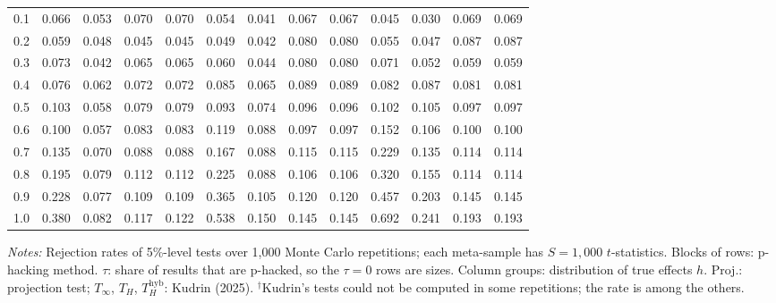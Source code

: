 \begin{table}[htbp]
\begin{tabular}{lcccccccccccc}
0.1 & 0.066 & 0.053 & 0.070 & 0.070 & 0.054 & 0.041 & 0.067 & 0.067 & 0.045 & 0.030 & 0.069 & 0.069 \\
0.2 & 0.059 & 0.048 & 0.045 & 0.045 & 0.049 & 0.042 & 0.080 & 0.080 & 0.055 & 0.047 & 0.087 & 0.087 \\
0.3 & 0.073 & 0.042 & 0.065 & 0.065 & 0.060 & 0.044 & 0.080 & 0.080 & 0.071 & 0.052 & 0.059 & 0.059 \\
0.4 & 0.076 & 0.062 & 0.072 & 0.072 & 0.085 & 0.065 & 0.089 & 0.089 & 0.082 & 0.087 & 0.081 & 0.081 \\
0.5 & 0.103 & 0.058 & 0.079 & 0.079 & 0.093 & 0.074 & 0.096 & 0.096 & 0.102 & 0.105 & 0.097 & 0.097 \\
0.6 & 0.100 & 0.057 & 0.083 & 0.083 & 0.119 & 0.088 & 0.097 & 0.097 & 0.152 & 0.106 & 0.100 & 0.100 \\
0.7 & 0.135 & 0.070 & 0.088 & 0.088 & 0.167 & 0.088 & 0.115 & 0.115 & 0.229 & 0.135 & 0.114 & 0.114 \\
0.8 & 0.195 & 0.079 & 0.112 & 0.112 & 0.225 & 0.088 & 0.106 & 0.106 & 0.320 & 0.155 & 0.114 & 0.114 \\
0.9 & 0.228 & 0.077 & 0.109 & 0.109 & 0.365 & 0.105 & 0.120 & 0.120 & 0.457 & 0.203 & 0.145 & 0.145 \\
1.0 & 0.380 & 0.082 & 0.117 & 0.122 & 0.538 & 0.150 & 0.145 & 0.145 & 0.692 & 0.241 & 0.193 & 0.193 \\
\bottomrule
\end{tabular}
\par\smallskip
\begin{minipage}{\linewidth}\footnotesize\textit{Notes:} Rejection rates of 5\%-level tests over 1,000 Monte Carlo repetitions; each meta-sample has $S = 1{,}000$ $t$-statistics. Blocks of rows: p-hacking method. $\tau$: share of results that are p-hacked, so the $\tau = 0$ rows are sizes. Column groups: distribution of true effects $h$. Proj.: projection test; $T_\infty$, $T_H$, $T_H^{\mathrm{hyb}}$: Kudrin (2025). $^\dagger$Kudrin's tests could not be computed in some repetitions; the rate is among the others.\end{minipage}
\end{table}
